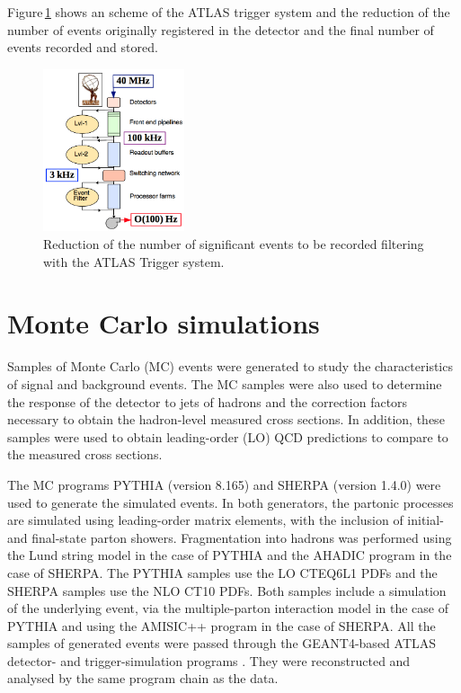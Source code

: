 \documentclass[12pt, twoside]{article}
\numberwithin{equation}{section}
\numberwithin{figure}{section}
\begin{document}
Figure\,\ref{fig:ATLASTriggerSystem} shows an scheme of the ATLAS trigger system and the reduction of the number of events originally registered in the detector and the final number of events recorded and stored.
\vspace{1.0cm}
\begin{figure}[h]
    \centering
    \includegraphics[width=0.37\textwidth]{./images/ATLAS_Trigger.png}
    \captionsetup{width=0.9\textwidth}
    \caption{Reduction of the number of significant events to be recorded filtering with the ATLAS Trigger system.}
    \label{fig:ATLASTriggerSystem}
\end{figure}


%
%
\newpage
\thispagestyle{empty}
\section{Monte Carlo simulations}
\label{sec:MonteCarlo}
\vspace{1.0cm}

Samples of Monte Carlo (MC) events were generated to study the characteristics of signal and background events. The MC samples were also used to determine the response of the detector to jets of hadrons and the correction factors necessary to obtain the hadron-level measured cross sections. In addition, these samples were used to obtain leading-order (LO) QCD predictions to compare to the measured cross sections.

The MC programs PYTHIA (version 8.165) \cite{PYTHIA} and SHERPA (version 1.4.0) \cite{SHERPA} were used to generate the simulated events. In both generators, the partonic processes are simulated using leading-order matrix elements, with the inclusion of initial- and final-state parton showers. Fragmentation into hadrons was performed using the Lund string model \cite{lund} in the case of PYTHIA and the AHADIC \cite{SHERPA} program in the case of SHERPA. The PYTHIA samples use the LO CTEQ6L1 \cite{LOCTEQ6L1} PDFs and the SHERPA samples use the NLO CT10 \cite{NLOCT10} PDFs. Both samples include a simulation of the underlying event, via the multiple-parton interaction model in the case of PYTHIA and using the AMISIC++ program in the case of SHERPA. All the samples of generated events were passed through the GEANT4-based \cite{Geant4} ATLAS detector- and trigger-simulation programs \cite{triggerSimulation}. They were reconstructed and analysed by the same program chain as the data.
\end{document}
